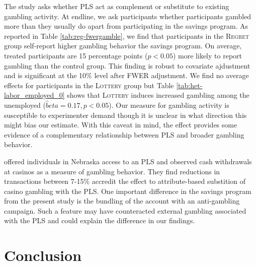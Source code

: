 \documentclass[12pt]{article}
\begin{document}
		The study asks whether PLS act as complement or substitute to existing gambling activity. At endline, we ask participants whether participants gambled more than they usually do apart from participating in the savings program. As reported in Table \ref{tab:reg-fwergamble}, we find that participants in the \textsc{Regret} group self-report higher gambling behavior the savings program. On average, treated participants are 15 percentage points ($p < 0.05$) more likely to report gambling than the control group. This finding is robust to covariate ajdustment and is significant at the 10\% level after FWER adjustment. We find no average effects for participants in the \textsc{Lottery} group but Table \ref{tab:het-labor_employed_0} shows that \textsc{Lottery} induces increased gambling among the unemployed ($\hat beta = 0.17, p < 0.05$). Our measure for gambling activity is susceptible to experimenter demand though it is unclear in what direction this might bias our estimate. With this caveat in mind, the effect provides some evidence of a complementary relationship between PLS and broader gambling behavior.

		 offered individuals in Nebraska access to an PLS and observed cash withdrawals at casinos as a measure of gambling behavior. They find reductions in transactions between 7-15\% accredit the effect to attribute-based substition of casino gambling with the PLS. One important difference in the savings program from the present study is the bundling of the account with an anti-gambling campaign. Such a feature may have counteracted external gambling associated with the PLS and could explain the difference in our findings.


		

\section{Conclusion} \label{sec:conclusion}
\end{document}
